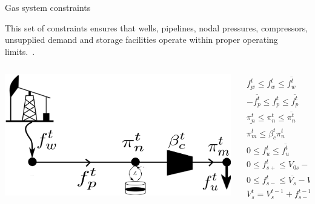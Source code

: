 \documentclass[hyperref={colorlinks,citecolor=blue,linkcolor=blue,urlcolor=blue}]{beamer}
\begin{document}
\begin{frame}{Gas system constraints}

This set of constraints ensures that wells, pipelines, nodal pressures, compressors, unsupplied demand and storage facilities operate within proper operating limits.~\cite{MPNG}.

\begin{columns}
\begin{column}{0.24\textwidth}
    \includegraphics[width=1.5\textwidth]{figures/gas_dummy.png}
\end{column}
\begin{column}{0.8\textwidth}
\scriptsize  %

\begin{subequations}
\begin{align}
    \underline{f_{w}^t} \leq f_{w}^t \leq \overline{f_{w}^t} &\quad \forall \ w \in \mathcal{W} \label{eq:well_limits} \\
    -\overline{f_{p}^t} \leq f_{p}^t \leq \overline{f_{p}^t} &\quad \forall \ p \in \mathcal{P} \label{eq:pipe_limits} \\
    \underline{\pi_{n}^t} \leq \pi_{n}^t \leq \overline{\pi_{n}^t} &\quad \forall \ n \in \mathcal{N}_f \label{eq:press_limit} \\
    \pi_{m}^t \leq \beta_{c}^t{\pi_{n}^t} &\quad \forall \ c=(n,m) \in \mathcal{C} \label{eq:comp_ratio} \\
    0 \leq f_{u}^{t} \leq \overline{f_{u}^{t}} &\quad \forall \ u \in \mathcal{U} \label{eq:dem_limit_gas} \\
    0 \leq f_{s+}^t \leq V_{0s} - \underline{V_s} &\quad \forall \ s \in \mathcal{S} \label{eq:sto_limit1} \\
    0 \leq f_{s-}^t \leq \overline{V_s} - V_{0s} &\quad \forall \ s \in \mathcal{S} \label{eq:sto_limit2} \\
    V_{s}^t = V_{s}^{t-1} + f_{s-}^{t-1} - f_{s+}^{t-1} &\quad \forall \ s \in \mathcal{S} \label{eq:sto_time}
\end{align}
\end{subequations}

\end{column}
\end{columns}
\end{frame}
%
\end{document}
